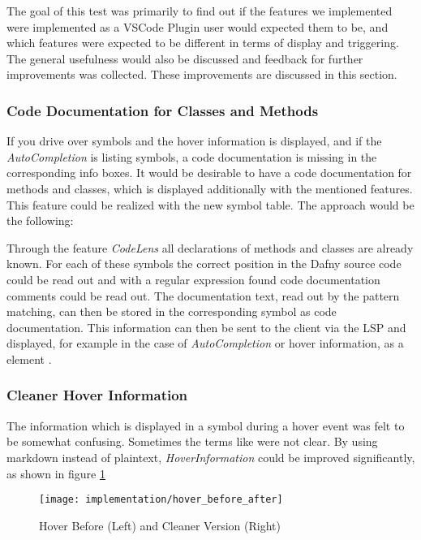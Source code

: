 The goal of this test was primarily to find out if the features
we implemented were implemented as a VSCode Plugin user would expected them to be,
and which features were expected to be different in terms of display and triggering. \\

The general usefulness would also be discussed and feedback for further improvements was collected.
These improvements are discussed in this section.

\subsubsection{Code Documentation for Classes and Methods}
If you drive over symbols and the hover information is displayed,
and if the \textit{AutoCompletion} is listing symbols,
a code documentation is missing in the corresponding info boxes.
It would be desirable to have a code documentation for methods and classes,
which is displayed additionally with the mentioned features. \\

This feature could be realized with the new symbol table. The approach would be the following:

Through the feature \textit{CodeLens} all declarations of methods and classes are already known.
For each of these symbols the correct position in the Dafny source code could be read out
and with a regular expression found code documentation comments could be read out.
The documentation text, read out by the pattern matching, can then be stored in the corresponding symbol as code documentation.
This information can then be sent to the client via the LSP and displayed,
for example in the case of \textit{AutoCompletion} or hover information,
as a  element \cite{vscodeAPI}.

\subsubsection{Cleaner Hover Information}
The information which is displayed in a symbol during a hover event was felt to be somewhat confusing.
Sometimes the terms like  were not clear.
By using markdown instead of plaintext, \textit{HoverInformation} could be improved significantly, as shown in figure \ref{fig:hoverNowVsThen}\\

\begin{figure}[H]
    \centering
    \texttt{[image: implementation/hover\_before\_after]}
    \caption{Hover Before (Left) and Cleaner Version (Right)}
    \label{fig:hoverNowVsThen}
\end{figure}

